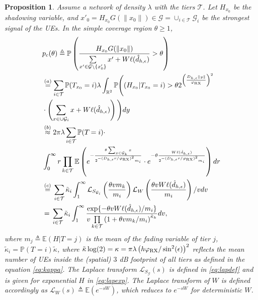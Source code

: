 \documentclass[conference]{IEEEtran}
\newcommand{\R}{\mathbb{R}}
\theoremstyle{definition}
\theoremstyle{plain}
\newtheorem{prop}[thm4]{Proposition}
\begin{document}
            
          \begin{prop}
            Assume a network of density $\lambda$ with the tiers $\mathcal{T}$. Let $H_{x_0}$ be the shadowing variable, and ${x'}_0 =  H_{x_0}G(\|x_0\|) \in \mathcal{G} =\cup_{i \in \mathcal{T}} \mathcal{G}_i$ be the strongest signal of the UEs. In the simple coverage region $\theta \geq 1$,
            \begin{align}
              \label{eq:probofcov}
              &p_c(\theta) \triangleq \mathbb{P}\left( \frac{H_{x_0} G(\|x_0\|)}{\sum\limits_{x' \in   \mathcal{G} \setminus \{x'_0\}}x'  + W\ell(\hat{d}_{h,\epsilon})} > \theta \right) \nonumber \\      
              &\overset{(a)}= \sum_{i\in \mathcal{T}} \mathbb{P}(T_{x_0}  = i)\lambda \int_{ \R^2}\mathbb{P}\Bigg((H_{x_0}|T_{x_0} = i) > \theta  2^{\left(\frac{D_{h,\epsilon}\|y\|}{\varphi_{\textup{RX}}}\right)^2 } \nonumber \\
              &\cdot \left(\sum_{x \in \cup\mathcal{G}_i }x +W\ell(\hat{d}_{h,\epsilon}) \right)\Bigg) \nonumber dy  \nonumber  \\              
              &\overset{(b)}{\approx} 2 \pi \lambda\sum_{i\in \mathcal{T}} \mathbb{P}(T_{}  = i) \cdot \nonumber \\
              &\int_{0}^{\infty} r \prod_{k \in \mathcal{T}}\mathbb{E} \left(e^{-\frac{\theta \sum_{x \in { \mathcal{G}_k}} x}{2^{-(D_{h,\epsilon}r/\varphi_{\textup{RX}})^2} m_i  }} \cdot e^{- \theta   \frac{W\ell(\hat{d}_{h,\epsilon})}{2^{-(D_{h,\epsilon}r/\varphi_{\textup{RX}})^2} m_i}} \right) dr \nonumber \\
              &\overset{(c)}{=}   {} \sum_{i \in \mathcal{T}}\tilde{\kappa}_i\int_1^{\infty} \mathcal{L}_{S_{\mathcal{G}_i}}\left(\frac{\theta v  m_k}{m_i} \right)  \mathcal{L}_{W}\left( \frac{\theta vW\ell(\hat{d}_{h,\epsilon})}{m_i} \right)/v dv \nonumber \\
              &\overset{}{=}   {} \sum_{i \in \mathcal{T}} \tilde{\kappa}_i\int_1^{\infty}  \frac{\exp \{- \theta v W\ell(\hat{d}_{h,\epsilon})/m_i \}}{v\prod\limits_{k \in \mathcal{T}}\left(1 + \theta v  m_k/m_i\right)^{\tilde{\kappa}_k}} dv,
            \end{align}
            where $m_j \triangleq \mathbb{E}(H| T = j)$ is the mean of the fading variable of tier $j$, $\tilde{\kappa}_i =\mathbb{P}(T_{}  = i) {\tilde{\kappa}}$, where $   \tilde{\kappa}\log(2)= \kappa=\pi \lambda   \left(h \varphi_{\textup{RX}}/\sin^2(\epsilon) \right)^2$ reflects the mean number of UEs inside the (spatial) $3$ dB footprint of all tiers as defined in the equation \eqref{eq:kappa}. The Laplace transform $\mathcal{L}_{S_\mathcal{G}}(s)$ is defined in \eqref{eq:lapdef} and is given for exponential $H$ in \eqref{eq:lapexp}. The Laplace transform of $W$ is defined accordingly as $\mathcal{L}_W(s) \triangleq \mathbb{E}\left(e^{-sW} \right)$, which reduces to $e^{-sW}$ for deterministic $W$.

\end{prop}
\end{document}
